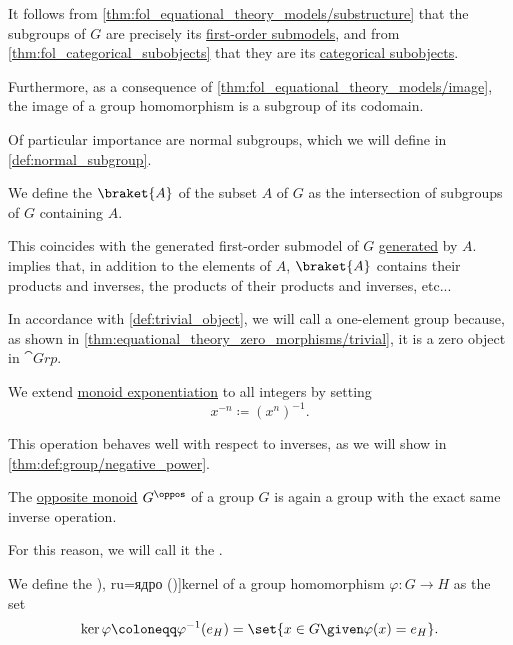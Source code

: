\begin{definition}
\begin{thmenum}
    It follows from \cref{thm:fol_equational_theory_models/substructure} that the subgroups of \( G \) are precisely its \hyperref[def:fol_substructure/submodel]{first-order submodels}, and from \cref{thm:fol_categorical_subobjects} that they are its \hyperref[def:categorical_subobject]{categorical subobjects}.

    Furthermore, as a consequence of \cref{thm:fol_equational_theory_models/image}, the image of a group homomorphism is a subgroup of its codomain.

    Of particular importance are normal subgroups, which we will define in \cref{def:normal_subgroup}.

     We define the  \( \braket{ A } \) of the subset \( A \) of \( G \) as the intersection of subgroups of \( G \) containing \( A \).

    This coincides with the generated first-order submodel of \( G \) \hyperref[def:fol_generated_substructure]{generated} by \( A \).  implies that, in addition to the elements of \( A \), \( \braket{ A } \) contains their products and inverses, the products of their products and inverses, etc...

    \mimprovised In accordance with \cref{def:trivial_object}, we will call a one-element group  because, as shown in \cref{thm:equational_theory_zero_morphisms/trivial}, it is a zero object in \( \cat{Grp} \).

     We extend \hyperref[def:monoid/exponentiation]{monoid exponentiation} to all integers by setting
    \begin{equation}\label{eq:def:group/exponentiation}
      x^{-n} \coloneqq (x^n)^{-1}.
    \end{equation}

    This operation behaves well with respect to inverses, as we will show in \cref{thm:def:group/negative_power}.

     The \hyperref[def:monoid/opposite]{opposite monoid} \( G^\oppos \) of a group \( G \) is again a group with the exact same inverse operation.

    For this reason, we will call it the .

     We define the \term[bg=ядро (\cite[def. IV.16]{ГеновМиховскиМоллов1991Алгебра}), ru=ядро (\cite[104]{Тыртышников2017ОсновыАлгебры})]{kernel} of a group homomorphism \( \varphi: G \to H \) as the set
    \begin{equation}\label{eq:def:group/kernel}
      \ker \varphi \coloneqq \varphi^{-1}(e_H) = \set{ x \in G \given \varphi(x) = e_H }.
    \end{equation}


\end{thmenum}
\end{definition}
